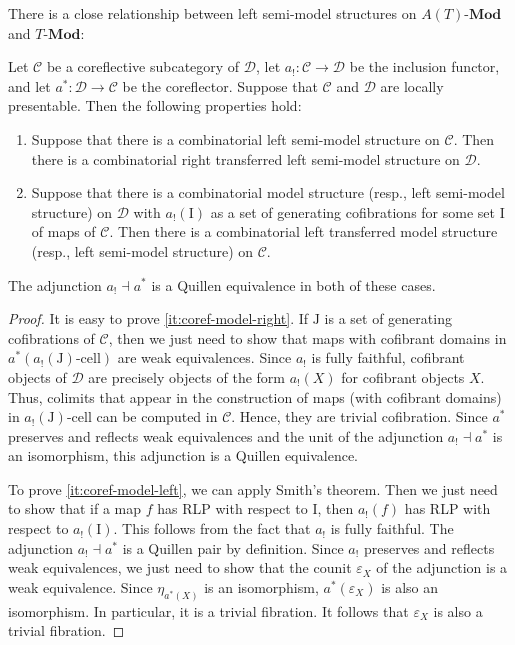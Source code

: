 \documentclass[reqno]{amsart}
\theoremstyle{definition}
\theoremstyle{remark}
\newcommand{\fs}[1]{\mathrm{#1}}
\newcommand{\cat}[1]{\mathcal{#1}}
\newcommand{\C}{\cat{C}}
\newcommand{\D}{\cat{D}}
\newcommand{\Mod}[1]{#1\text{-}\mathbf{Mod}}
\newcommand{\I}{\fs{I}}
\newcommand{\J}{\fs{J}}
\newcommand{\class}[2]{#1\text{-}\mathrm{#2}}
\newcommand{\Icell}[1][\I]{\class{#1}{cell}}
\numberwithin{figure}{section}
\begin{document}
There is a close relationship between left semi-model structures on $\Mod{A(T)}$ and $\Mod{T}$:

\begin{prop}
Let $\C$ be a coreflective subcategory of $\D$, let $a_! : \C \to \D$ be the inclusion functor, and let $a^* : \D \to \C$ be the coreflector.
Suppose that $\C$ and $\D$ are locally presentable.
Then the following properties hold:
\begin{enumerate}
\item \label{it:coref-model-right}
Suppose that there is a combinatorial left semi-model structure on $\C$.
Then there is a combinatorial right transferred left semi-model structure on $\D$.
\item \label{it:coref-model-left}
Suppose that there is a combinatorial model structure (resp., left semi-model structure) on $\D$ with $a_!(\I)$ as a set of generating cofibrations for some set $\I$ of maps of $\C$.
Then there is a combinatorial left transferred model structure (resp., left semi-model structure) on $\C$.
\end{enumerate}
The adjunction $a_! \dashv a^*$ is a Quillen equivalence in both of these cases.
\end{prop}
\begin{proof}
It is easy to prove \eqref{it:coref-model-right}.
If $\J$ is a set of generating cofibrations of $\C$, then we just need to show that maps with cofibrant domains in $a^*(\Icell[a_!(\J)])$ are weak equivalences.
Since $a_!$ is fully faithful, cofibrant objects of $\D$ are precisely objects of the form $a_!(X)$ for cofibrant objects $X$.
Thus, colimits that appear in the construction of maps (with cofibrant domains) in $\Icell[a_!(\J)]$ can be computed in $\C$.
Hence, they are trivial cofibration.
Since $a^*$ preserves and reflects weak equivalences and the unit of the adjunction $a_! \dashv a^*$ is an isomorphism, this adjunction is a Quillen equivalence.

To prove \eqref{it:coref-model-left}, we can apply Smith's theorem.
Then we just need to show that if a map $f$ has RLP with respect to $\I$, then $a_!(f)$ has RLP with respect to $a_!(\I)$.
This follows from the fact that $a_!$ is fully faithful.
The adjunction $a_! \dashv a^*$ is a Quillen pair by definition.
Since $a_!$ preserves and reflects weak equivalences, we just need to show that the counit $\varepsilon_X$ of the adjunction is a weak equivalence.
Since $\eta_{a^*(X)}$ is an isomorphism, $a^*(\varepsilon_X)$ is also an isomorphism.
In particular, it is a trivial fibration.
It follows that $\varepsilon_X$ is also a trivial fibration.
\end{proof}
\end{document}
